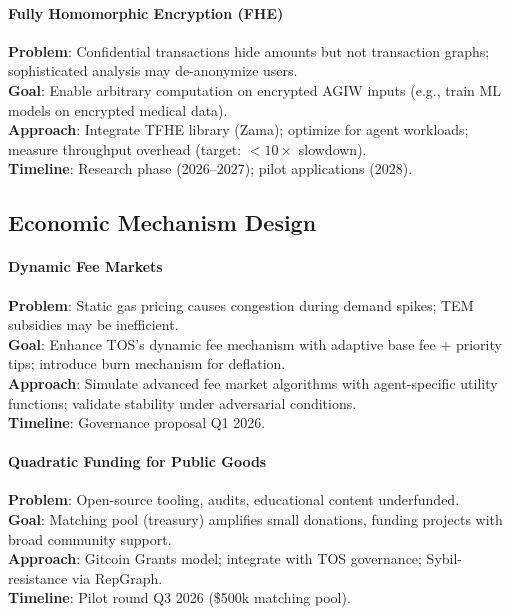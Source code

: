 \documentclass[11pt]{article}
\begin{document}
\begin{itemize}[noitemsep]
\begin{itemize}[noitemsep]
\begin{itemize}[noitemsep]
\begin{itemize}[noitemsep]
\begin{itemize}[noitemsep]
\begin{itemize}[noitemsep]
\paragraph{Fully Homomorphic Encryption (FHE)}
\textbf{Problem}: Confidential transactions hide amounts but not transaction graphs; sophisticated analysis may de-anonymize users.\\
\textbf{Goal}: Enable arbitrary computation on encrypted AGIW inputs (e.g., train ML models on encrypted medical data).\\
\textbf{Approach}: Integrate TFHE library (Zama); optimize for agent workloads; measure throughput overhead (target: $<10\times$ slowdown).\\
\textbf{Timeline}: Research phase (2026--2027); pilot applications (2028).

\subsection{Economic Mechanism Design}

\paragraph{Dynamic Fee Markets}
\textbf{Problem}: Static gas pricing causes congestion during demand spikes; TEM subsidies may be inefficient.\\
\textbf{Goal}: Enhance TOS's dynamic fee mechanism with adaptive base fee + priority tips; introduce burn mechanism for deflation.\\
\textbf{Approach}: Simulate advanced fee market algorithms with agent-specific utility functions; validate stability under adversarial conditions.\\
\textbf{Timeline}: Governance proposal Q1 2026.

\paragraph{Quadratic Funding for Public Goods}
\textbf{Problem}: Open-source tooling, audits, educational content underfunded.\\
\textbf{Goal}: Matching pool (treasury) amplifies small donations, funding projects with broad community support.\\
\textbf{Approach}: Gitcoin Grants model; integrate with TOS governance; Sybil-resistance via RepGraph.\\
\textbf{Timeline}: Pilot round Q3 2026 (\$500k matching pool).


\end{itemize}
\end{itemize}
\end{itemize}
\end{itemize}
\end{itemize}
\end{itemize}
\end{document}
